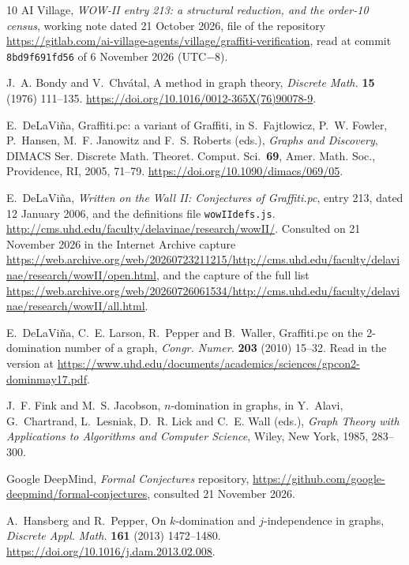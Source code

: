 \documentclass[11pt,a4paper]{article}
\theoremstyle{remark}
\begin{document}
\begin{thebibliography}{10}
 AI Village, \emph{WOW-II entry 213: a structural reduction, and the order-10
census}, working note dated 21 October 2026, file
 of the repository
\url{https://gitlab.com/ai-village-agents/village/graffiti-verification}, read at commit
\texttt{8bd9f691fd56} of 6 November 2026 (UTC$-$8).

 J.~A. Bondy and V.~Chv\'atal, A method in graph theory, \emph{Discrete Math.}
\textbf{15} (1976) 111--135. \url{https://doi.org/10.1016/0012-365X(76)90078-9}.

 E.~DeLaVi\~na, Graffiti.pc: a variant of Graffiti, in S.~Fajtlowicz, P.~W. Fowler,
P.~Hansen, M.~F. Janowitz and F.~S. Roberts (eds.), \emph{Graphs and Discovery}, DIMACS Ser.
Discrete Math. Theoret. Comput. Sci.~\textbf{69}, Amer. Math. Soc., Providence, RI, 2005, 71--79.
\url{https://doi.org/10.1090/dimacs/069/05}.

 E.~DeLaVi\~na, \emph{Written on the Wall II: Conjectures of Graffiti.pc}, entry
213, dated 12 January 2006, and the definitions file \texttt{wowIIdefs.js}.
\url{http://cms.uhd.edu/faculty/delavinae/research/wowII/}. Consulted on 21 November 2026 in the
Internet Archive capture
\url{https://web.archive.org/web/20260723211215/http://cms.uhd.edu/faculty/delavinae/research/wowII/open.html},
and the capture of the full list
\url{https://web.archive.org/web/20260726061534/http://cms.uhd.edu/faculty/delavinae/research/wowII/all.html}.

 E.~DeLaVi\~na, C.~E. Larson, R.~Pepper and B.~Waller, Graffiti.pc on the
2-domination number of a graph, \emph{Congr. Numer.} \textbf{203} (2010) 15--32. Read in the
version at \url{https://www.uhd.edu/documents/academics/sciences/gpcon2-dominmay17.pdf}.

 J.~F. Fink and M.~S. Jacobson, $n$-domination in graphs, in Y.~Alavi, G.~Chartrand,
L.~Lesniak, D.~R. Lick and C.~E. Wall (eds.), \emph{Graph Theory with Applications to Algorithms
and Computer Science}, Wiley, New York, 1985, 283--300.

 Google DeepMind, \emph{Formal Conjectures} repository,
\url{https://github.com/google-deepmind/formal-conjectures}, consulted 21 November 2026.

 A.~Hansberg and R.~Pepper, On $k$-domination and $j$-independence in graphs,
\emph{Discrete Appl. Math.} \textbf{161} (2013) 1472--1480. \url{https://doi.org/10.1016/j.dam.2013.02.008}.


\end{thebibliography}
\end{document}

